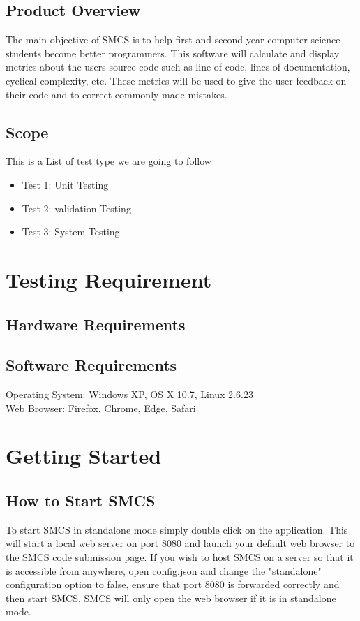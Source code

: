 \documentclass{scrreprt}
\begin{document}
	\section{Product Overview}
	The main objective of SMCS is to help first and second year computer science students become better programmers.
	This software will calculate and display metrics about the users source code such as line of code, lines of documentation, cyclical complexity, etc.
	These metrics will be used to give the user feedback on their code and to correct commonly made mistakes.
	
	\section{Scope}
	This is a List of test type we are going to follow
	\begin{itemize}
		\item Test 1: Unit Testing 
		\item Test 2: validation Testing 
		\item Test 3: System Testing
	\end{itemize}
	
	{\let\clearpage\relax \chapter{Testing Requirement}}
	
	\section{Hardware Requirements}
	

	\section{Software Requirements}
	Operating System: Windows XP, OS X 10.7, Linux 2.6.23\\
	Web Browser: Firefox, Chrome, Edge, Safari\\

	{\let\clearpage\relax \chapter{Getting Started}}
	\section{How to Start SMCS}
	To start SMCS in standalone mode simply double click on the application. 
	This will start a local web server on port 8080 and launch your default web browser to the SMCS code submission page. 
	If you wish to host SMCS on a server so that it is accessible from anywhere, open config.json and change the "standalone" configuration option to false, ensure that port 8080 is forwarded correctly and then start SMCS. 
	SMCS will only open the web browser if it is in standalone mode.
\end{document}
